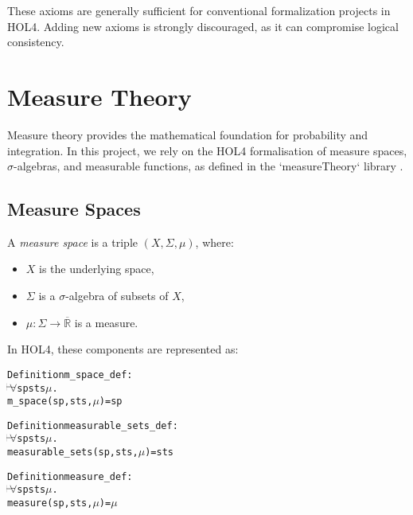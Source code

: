 These axioms are generally sufficient for conventional formalization projects in HOL4. Adding new axioms is strongly discouraged, as it can compromise logical consistency.

\section{Measure Theory}

Measure theory provides the mathematical foundation for probability and integration. In this project, we rely on the HOL4 formalisation of measure spaces, $\sigma$-algebras, and measurable functions, as defined in the `measureTheory` library \cite{hol4}.

\subsection{Measure Spaces}

A \emph{measure space} is a triple $ (X, \Sigma, \mu) $, where:
\begin{itemize}
  \item $ X $ is the underlying space,
  \item $ \Sigma $ is a $ \sigma $-algebra of subsets of $ X $,
  \item $ \mu : \Sigma \to \overline{\mathbb{R}} $ is a measure.
\end{itemize}

In HOL4, these components are represented as:
\begin{center}
\scriptsize
\begin{hol}
  \begin{alltt}
    Definition m\_space\_def :
    \(\!\!\!{\turn}\!\!\!\!\) \(\forall\)sp sts \(\mu\).
    m\_space (sp, sts, \(\mu\)) = sp
  \end{alltt}
\end{hol}

\begin{hol}
  \begin{alltt}
    Definition measurable\_sets\_def :
    \(\!\!\!{\turn}\!\!\!\!\) \(\forall\)sp sts \(\mu\).
    measurable\_sets (sp, sts, \(\mu\)) = sts
  \end{alltt}
\end{hol}

\begin{hol}
  \begin{alltt}
    Definition measure\_def :
    \(\!\!\!{\turn}\!\!\!\!\) \(\forall\)sp sts \(\mu\).
    measure (sp, sts, \(\mu\)) = \(\mu\)
  \end{alltt}
\end{hol}
\end{center}

